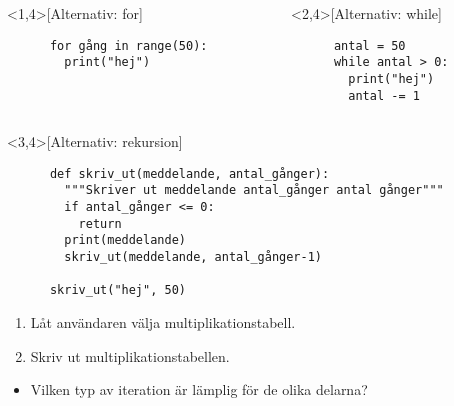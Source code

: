\begin{frame}[fragile]
  \begin{columns}[t]
    \begin{column}{0.5\columnwidth}
  \begin{example}<1,4>[Alternativ: for]
    \begin{verbatim}
      for gång in range(50):
        print("hej")
    \end{verbatim}
  \end{example}
    \end{column}

    \begin{column}{0.5\columnwidth}
  \begin{example}<2,4>[Alternativ: while]
    \begin{verbatim}
      antal = 50
      while antal > 0:
        print("hej")
        antal -= 1
    \end{verbatim}
  \end{example}
    \end{column}
  \end{columns}

  \begin{example}<3,4>[Alternativ: rekursion]
    \begin{verbatim}
      def skriv_ut(meddelande, antal_gånger):
        """Skriver ut meddelande antal_gånger antal gånger"""
        if antal_gånger <= 0:
          return
        print(meddelande)
        skriv_ut(meddelande, antal_gånger-1)

      skriv_ut("hej", 50)
    \end{verbatim}
  \end{example}
\end{frame}

\begin{frame}
  \begin{exercise}
    \begin{enumerate}
      \item Låt användaren välja multiplikationstabell.
      \item Skriv ut multiplikationstabellen.
    \end{enumerate}
  \end{exercise}

  \begin{question}
    \begin{itemize}
      \item Vilken typ av iteration är lämplig för de olika delarna?
    \end{itemize}
  \end{question}
\end{frame}

